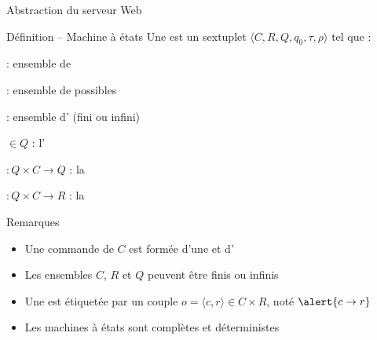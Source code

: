 
\begingroup


\begin{frame}{Abstraction du serveur Web}

  \begin{block}{Définition -- Machine à états}
    Une  est un sextuplet \alert{$\langle C, R, Q, q_0, \tau, \rho \rangle$} tel que :
    \begin{description}[xxx]
    \item[\alert{$C$}] : ensemble de  
      \hspace{\fill} {\footnotesize {}}
    \item[\alert{$R$}] : ensemble de  possibles
      \hspace{\fill} {\footnotesize {}}
    \item[\alert{$Q$}] : ensemble d' (fini ou infini)
      \hspace{\fill} {\footnotesize {}}
    \item[\alert{$q_0$}] $\in Q$ : l'
      \hspace{\fill} {\footnotesize {}}
    \item[\alert{$\tau$}] $: Q \times C \rightarrow Q$ : la 
      \hspace{\fill} {\footnotesize{}}
    \item[\alert{$\rho$}] $: Q \times C \rightarrow R$ : la 
      \hspace{\fill} {\footnotesize{}}
    \end{description}
  \end{block}

  \begin{block}{Remarques}
    \begin{itemize}
    \item Une commande de $C$ est formée d'une  et d'
    \item Les ensembles $C$, $R$ et $Q$ peuvent être finis ou infinis
    \item Une  est étiquetée par un couple $o = \langle c, r\rangle \in C \times R$, noté $\alert{c \rightarrow r}$
    \item Les machines à états sont complètes et déterministes
    \end{itemize}
  \end{block}
  

\end{frame}
